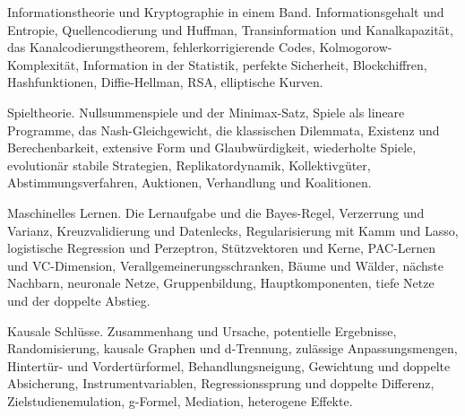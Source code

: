 \begin{merksatz}
Informationstheorie und Kryptographie in einem Band. Informationsgehalt und Entropie, Quellencodierung und Huffman, Transinformation und Kanalkapazität, das Kanalcodierungstheorem, fehlerkorrigierende Codes, Kolmogorow-Komplexität, Information in der Statistik, perfekte Sicherheit, Blockchiffren, Hashfunktionen, Diffie-Hellman, RSA, elliptische Kurven.

\end{merksatz}

\begin{merksatz}
Spieltheorie. Nullsummenspiele und der Minimax-Satz, Spiele als lineare Programme, das Nash-Gleichgewicht, die klassischen Dilemmata, Existenz und Berechenbarkeit, extensive Form und Glaubwürdigkeit, wiederholte Spiele, evolutionär stabile Strategien, Replikatordynamik, Kollektivgüter, Abstimmungsverfahren, Auktionen, Verhandlung und Koalitionen.

\end{merksatz}

\begin{merksatz}
Maschinelles Lernen. Die Lernaufgabe und die Bayes-Regel, Verzerrung und Varianz, Kreuzvalidierung und Datenlecks, Regularisierung mit Kamm und Lasso, logistische Regression und Perzeptron, Stützvektoren und Kerne, PAC-Lernen und VC-Dimension, Verallgemeinerungsschranken, Bäume und Wälder, nächste Nachbarn, neuronale Netze, Gruppenbildung, Hauptkomponenten, tiefe Netze und der doppelte Abstieg.

\end{merksatz}

\begin{merksatz}
Kausale Schlüsse. Zusammenhang und Ursache, potentielle Ergebnisse, Randomisierung, kausale Graphen und d-Trennung, zulässige Anpassungsmengen, Hintertür- und Vordertürformel, Behandlungsneigung, Gewichtung und doppelte Absicherung, Instrumentvariablen, Regressionssprung und doppelte Differenz, Zielstudienemulation, g-Formel, Mediation, heterogene Effekte.

\end{merksatz}

